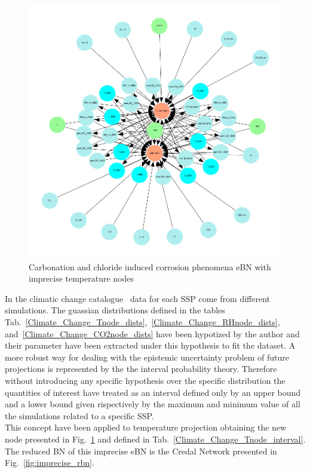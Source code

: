 \begin{figure}[H]
    \centering
    \includegraphics[width=\linewidth]{imgs/pdfs/14_total_ebn_imprecise.pdf}
    \caption{Carbonation and chloride induced corrosion phenomena eBN with imprecise temperature nodes}\label{fig:imprecise_ebn}
\end{figure}

In the climatic change catalogue~\cite{Copernicus_Climate_Change} data for each SSP come from different simulations. The guassian distributions defined in the tables Tab.~\ref{Climate_Change_Tnode_dists},~\ref{Climate_Change_RHnode_dists}, and~\ref{Climate_Change_CO2node_dists} have been hypotized by the author and their parameter have been extracted under this hypothesis to fit the dataset.
A more robust way for dealing with the epistemic uncertainty problem of future projections is represented by the the interval probability theory. Therefore without introducing any specific hypothesis over the specific distribution the quantities of interest have treated as an interval defined only by an upper bound and a lower bound given rispectively by the maximum and minimum value of all the simulations related to a specific SSP.\\
This concept have been applied to temperature projection obtaining the new node presented in Fig.~\ref{fig:imprecise_ebn} and defined in Tab.~\ref{Climate_Change_Tnode_interval}. The reduced BN of this imprecise eBN is the Credal Network presented in Fig.~\ref{fig:imprecise_rbn}.

